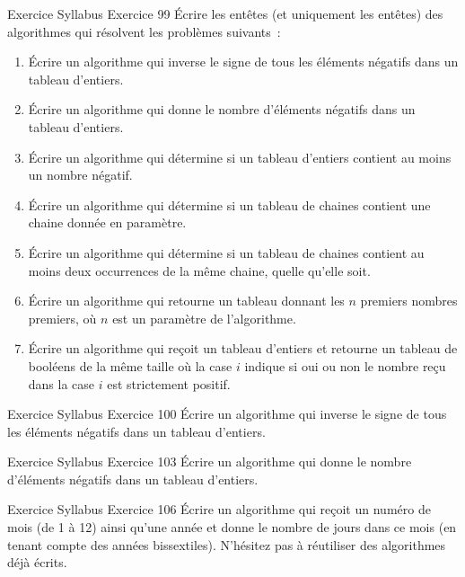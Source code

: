 \begin{frame}{Exercice \theexercice}{Syllabus Exercice 99}
    Écrire les entêtes (et uniquement les entêtes)
    des algorithmes qui résolvent les problèmes suivants~:
    \begin{enumerate}
        \item
        Écrire un algorithme qui
        inverse le signe de tous les éléments négatifs dans un tableau d’entiers.
        \item
        Écrire un algorithme qui
        donne le nombre d’éléments négatifs dans un tableau d’entiers.
        \item
        Écrire un algorithme qui
        détermine si un tableau d’entiers contient au moins un nombre négatif.
        \item
        Écrire un algorithme qui
        détermine si un tableau de chaines contient
        une chaine donnée en paramètre.
        \item
        Écrire un algorithme qui
        détermine si un tableau de chaines contient
        au moins deux occurrences de la même chaine,
        quelle qu’elle soit.
        \item
        Écrire un algorithme qui
        retourne un tableau donnant les $n$ premiers nombres premiers,
        où $n$ est un paramètre de l’algorithme.
        \item
        Écrire un algorithme qui
        reçoit un tableau d’entiers
        et retourne un tableau de booléens de la même taille
        où la case $i$ indique si oui ou non
        le nombre reçu dans la case $i$ est strictement positif.
    \end{enumerate}
\end{frame}

\begin{frame}{Exercice \theexercice}{Syllabus Exercice 100}
    Écrire un algorithme qui
    inverse le signe de tous les éléments négatifs dans un tableau d’entiers.
\end{frame}

\begin{frame}{Exercice \theexercice}{Syllabus Exercice 103}
    Écrire un algorithme qui
    donne le nombre d’éléments négatifs dans un tableau d’entiers.
\end{frame}

\begin{frame}{Exercice \theexercice}{Syllabus Exercice 106}
    Écrire un algorithme qui reçoit un numéro de mois (de 1 à 12)
    ainsi qu’une année et donne le nombre de jours dans ce mois
    (en tenant compte des années bissextiles).
    N’hésitez pas à réutiliser des algorithmes déjà écrits.
\end{frame}
